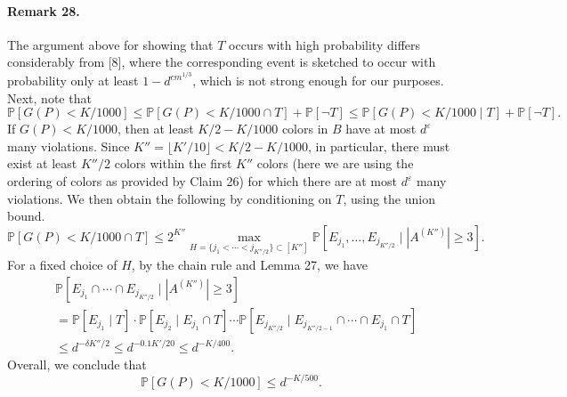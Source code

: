\paragraph{Remark 28.} The argument above for showing that $T$ occurs with high probability differs considerably from [8], where the corresponding event is sketched to occur with probability only at least $1-d^{cm^{1/3}}$, which is not strong enough for our purposes.
Next, note that
\[\mathbb P[G(P)<K/1000]\leq\mathbb P[G(P)<K/1000\cap T]+\mathbb P[\neg T]\leq\mathbb P[G(P)<K/1000\mid T]+\mathbb P[\neg T].\]
If $G(P)<K/1000$, then at least $K/2-K/1000$ colors in $B$ have at most $d^\varepsilon$ many violations. Since $K''=\lfloor K'/10\rfloor<K/2-K/1000$, in particular, there must exist at least $K''/2$ colors within the first $K''$ colors (here we are using the ordering of colors as provided by Claim 26) for which there are at most $d^\varepsilon$ many violations. We then obtain the following by conditioning on $T$, using the union bound.
\[\mathbb P[G(P)<K/1000\cap T]\leq2^{K''}\max_{H=\{j_1<\cdots<j_{K''/2}\}\subset[K'']}\mathbb P[E_{j_1},\ldots,E_{j_{K''/2}}\mid|A^{(K'')}|\geq3].\]
For a fixed choice of $H$, by the chain rule and Lemma 27, we have
\begin{align*}
&\mathbb P[E_{j_1}\cap\cdots\cap E_{j_{K''/2}}\mid|A^{(K'')}|\geq3]\\
&=\mathbb P[E_{j_1}\mid T]\cdot\mathbb P[E_{j_2}\mid E_{j_1}\cap T]\cdots\mathbb P[E_{j_{K''/2}}\mid E_{j_{K''/2-1}}\cap\cdots\cap E_{j_1}\cap T]\\
&\leq d^{-\delta K''/2}\leq d^{-0.1K'/20}\leq d^{-K/400}.
\end{align*}
Overall, we conclude that
\[\mathbb P[G(P)<K/1000]\leq d^{-K/500}.\]
